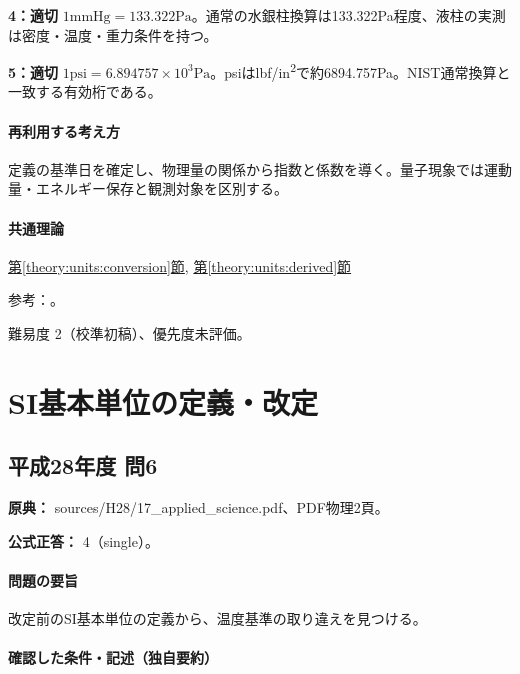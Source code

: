 \noindent\textbf{4：適切} \(1\mathrm{mmHg}=133.322\mathrm{Pa}\)。通常の水銀柱換算は133.322Pa程度、液柱の実測は密度・温度・重力条件を持つ。\par

\noindent\textbf{5：適切} \(1\mathrm{psi}=6.894757\times10^3\mathrm{Pa}\)。psiはlbf/in\textsuperscript{2}で約6894.757Pa。NIST通常換算と一致する有効桁である。\par

\paragraph{再利用する考え方} 定義の基準日を確定し、物理量の関係から指数と係数を導く。量子現象では運動量・エネルギー保存と観測対象を区別する。

\paragraph{共通理論} \hyperref[theory:units:conversion]{第\ref*{theory:units:conversion}節}, \hyperref[theory:units:derived]{第\ref*{theory:units:derived}節}

\par 参考：\cite{si_nist811}。

\par 難易度 2（校準初稿）、優先度未評価。

\section{SI基本単位の定義・改定}

\subsection{平成28年度 問6}
\label{q:h28-reg-applied-06}

\noindent\textbf{原典：} sources/H28/17\_applied\_science.pdf、PDF物理2頁。

\textbf{公式正答：} 4（single）。

\paragraph{問題の要旨} 改定前のSI基本単位の定義から、温度基準の取り違えを見つける。

\paragraph{確認した条件・記述（独自要約）}\mbox{}\par

